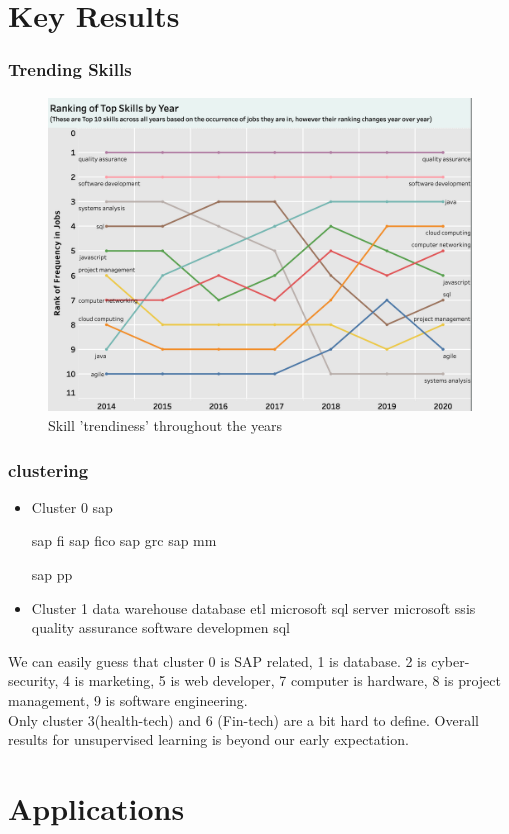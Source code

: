 \documentclass[10pt,mathserif]{beamer}
\begin{document}
\section{Key Results}
	\begin{frame}
	\frametitle{Trending Skills}
\begin{figure}[h]
	\begin{center}
		\includegraphics[width=.8\linewidth]{./photos/top10 ranking.png}
	\end{center}
	\caption{Skill 'trendiness' throughout the years}
	\label{trending}
\end{figure}

\end{frame}

	\begin{frame}
	\frametitle{clustering}
	\begin{itemize}
	\item Cluster 0
	sap	

	sap fi	
	sap fico	
	sap grc	
	sap mm

	sap pp	
	\item Cluster 1
	data warehouse	
	database
	etl	
	microsoft sql server
	microsoft ssis	
	quality assurance	
	software developmen
	sql
\end{itemize}	
We can easily guess that cluster 0 is SAP related, 1 is database. 2 is cyber-security, 4 is marketing, 5 is web developer, 7 computer is hardware, 8 is project management, 9 is software engineering.\\
Only cluster 3(health-tech) and 6 (Fin-tech) are a bit hard to define. Overall results for unsupervised learning is beyond our early expectation.
\end{frame}
\section{Applications}	
\end{document}
